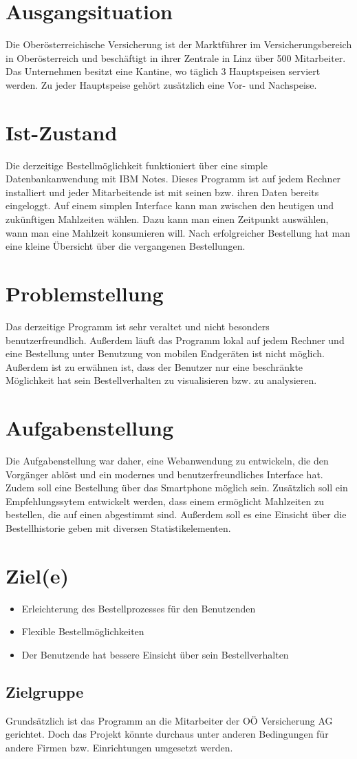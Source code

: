 \section{Ausgangsituation}
\author{Benjamin Besic}
Die Oberösterreichische Versicherung ist der Marktführer im Versicherungsbereich in Oberösterreich 
und beschäftigt in ihrer Zentrale in Linz über 500 Mitarbeiter.
Das Unternehmen besitzt eine Kantine, wo täglich 3 Hauptspeisen serviert werden. Zu jeder Hauptspeise gehört zusätzlich eine Vor- 
und Nachspeise.
\section{Ist-Zustand}
\author{Benjamin Besic}
Die derzeitige Bestellmöglichkeit funktioniert über eine simple Datenbankanwendung mit IBM Notes.
Dieses Programm ist auf jedem Rechner installiert und jeder Mitarbeitende ist mit seinen bzw. ihren Daten bereits eingeloggt.
Auf einem simplen Interface kann man zwischen den heutigen und zukünftigen Mahlzeiten wählen. Dazu kann man einen Zeitpunkt auswählen,
wann man eine Mahlzeit konsumieren will. 
Nach erfolgreicher Bestellung hat man eine kleine Übersicht über die vergangenen Bestellungen.
\section{Problemstellung}
\author{Benjamin Besic}
Das derzeitige Programm ist sehr veraltet und nicht besonders benutzerfreundlich. Außerdem
läuft das Programm lokal auf jedem Rechner und eine Bestellung unter Benutzung von mobilen Endgeräten ist nicht möglich.
Außerdem ist zu erwähnen ist, dass der Benutzer nur eine beschränkte Möglichkeit hat sein Bestellverhalten 
zu visualisieren bzw. zu analysieren.
\section{Aufgabenstellung}
\author{Benjamin Besic}
Die Aufgabenstellung war daher, eine Webanwendung zu entwickeln, die den Vorgänger ablöst
und ein modernes und benutzerfreundliches Interface hat. Zudem soll eine Bestellung über das Smartphone
möglich sein. Zusätzlich soll ein Empfehlungssytem entwickelt werden, dass einem ermöglicht Mahlzeiten zu 
bestellen, die auf einen abgestimmt sind. Außerdem soll es eine Einsicht über die Bestellhistorie geben
mit diversen Statistikelementen.
\section{Ziel(e)}
\author{Benjamin Besic}
\begin{itemize}
    \item Erleichterung des Bestellprozesses für den Benutzenden
    \item Flexible Bestellmöglichkeiten
    \item Der Benutzende hat bessere Einsicht über sein Bestellverhalten
\end{itemize}

\subsection{Zielgruppe}
Grundsätzlich ist das  Programm an die Mitarbeiter der OÖ Versicherung AG gerichtet. Doch das Projekt
könnte durchaus unter anderen Bedingungen für andere Firmen bzw. Einrichtungen umgesetzt werden.


